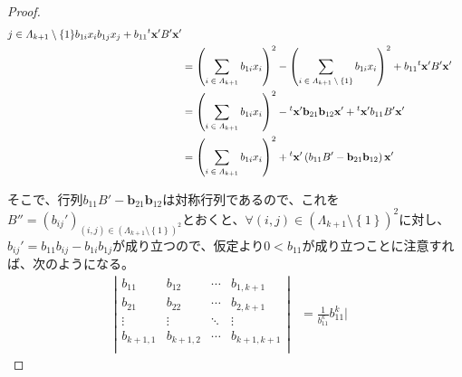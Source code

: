 \documentclass[dvipdfmx]{jsarticle}
\begin{document}
\begin{proof}
\begin{align*}
{{\begin{matrix}
j \in \varLambda_{k + 1} \setminus \left\{ 1 \right\} \\
\end{matrix}} {b_{1i}x_{i}b_{1j}x_{j}}} + b_{11}{}^t \mathbf{x}'B'\mathbf{x}'\\
&= \left( \sum_{\scriptsize \begin{matrix}
i \in \varLambda_{k + 1} \\
\end{matrix}} {b_{1i}x_{i}} \right)^{2} - \left( \sum_{\scriptsize \begin{matrix}
i \in \varLambda_{k + 1} \setminus \left\{ 1 \right\} \\
\end{matrix}} {b_{1i}x_{i}} \right)^{2} + b_{11}{}^t \mathbf{x}'B'\mathbf{x}'\\
&= \left( \sum_{\scriptsize \begin{matrix}
i \in \varLambda_{k + 1} \\
\end{matrix}} {b_{1i}x_{i}} \right)^{2} -{}^t \mathbf{x}'\mathbf{b}_{21}\mathbf{b}_{12}\mathbf{x}' +{}^t \mathbf{x}'b_{11}B'\mathbf{x}'\\
&= \left( \sum_{\scriptsize \begin{matrix}
i \in \varLambda_{k + 1} \\
\end{matrix}} {b_{1i}x_{i}} \right)^{2} +{}^t \mathbf{x}'\left( b_{11}B' - \mathbf{b}_{21}\mathbf{b}_{12} \right)\mathbf{x}'
\end{align*}\par
そこで、行列$b_{11}B' - \mathbf{b}_{21}\mathbf{b}_{12}$は対称行列であるので、これを$B'' = \left( b_{ij}' \right)_{(i,j) \in \left( \varLambda_{k + 1} \setminus \left\{ 1 \right\} \right)^{2}}$とおくと、$\forall(i,j) \in \left( \varLambda_{k + 1} \setminus \left\{ 1 \right\} \right)^{2}$に対し、$b_{ij}' = b_{11}b_{ij} - b_{1i}b_{1j}$が成り立つので、仮定より$0 < b_{11}$が成り立つことに注意すれば、次のようになる。
\begin{align*}
\left| \begin{matrix}
b_{11} & b_{12} & \cdots & b_{1,k + 1} \\
b_{21} & b_{22} & \cdots & b_{2,k + 1} \\
 \vdots & \vdots & \ddots & \vdots \\
b_{k + 1,1} & b_{k + 1,2} & \cdots & b_{k + 1,k + 1} \\
\end{matrix} \right| &= \frac{1}{b_{11}^{k}}b_{11}^{k}\left| \begin{matrix}

\end{matrix}
\end{align*}
\end{proof}
\end{document}
